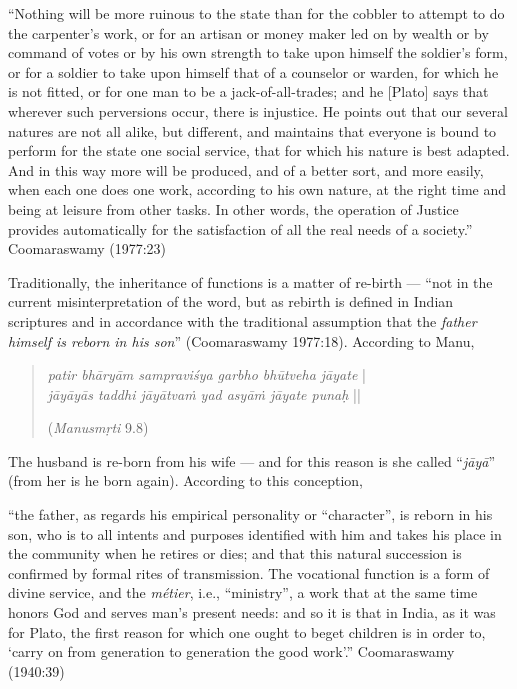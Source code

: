 \begin{myquote}
“Nothing will be more ruinous to the state than for the cobbler to attempt to do the carpenter’s work, or for an artisan or money maker led on by wealth or by command of votes or by his own strength to take upon himself the soldier’s form, or for a soldier to take upon himself that of a counselor or warden, for which he is not fitted, or for one man to be a jack-of-all-trades; and he [Plato] says that wherever such perversions occur, there is injustice. He points out that our several natures are not all alike, but different, and maintains that everyone is bound to perform for the state one social service, that for which his nature is best adapted. And in this way more will be produced, and of a better sort, and more easily, when each one does one work, according to his own nature, at the right time and being at leisure from other tasks. In other words, the operation of Justice provides automatically for the satisfaction of all the real needs of a society.”
\hfill Coomaraswamy (1977:23)
\end{myquote}

Traditionally, the inheritance of functions is a matter of re-birth --- “not in the current misinterpretation of the word, but as rebirth is defined in Indian scriptures and in accordance with the traditional assumption that the {\sl father himself is reborn in his son}” (Coomaraswamy 1977:18). According to Manu,\\[-20pt] 
\begin{quote}
{{\sl patir bhāryām sampraviśya garbho bhūtveha jāyate}} |\\
{\sl jāyāyās taddhi jāyātvaṁ yad asyāṁ jāyate punaḥ} || 

\hfill ({\sl Manusmṛti} 9.8) 
\end{quote}

The husband is re-born from his wife --- and for this reason is she called “{\sl jāyā}” (from her is he born again). According to this conception, 

\begin{myquote}
“the father, as regards his empirical personality or “character”, is reborn in his son, who is to all intents and purposes identified with him and takes his place in the community when he retires or dies; and that this natural succession is confirmed by formal rites of transmission. The vocational function is a form of divine service, and the {\sl métier}, i.e., “ministry”, a work that at the same time honors God and serves man’s present needs: and so it is that in India, as it was for Plato, the first reason for which one ought to beget children is in order to, ‘carry on from generation to generation the good work’.”
\hfill Coomaraswamy (1940:39)
\end{myquote}

